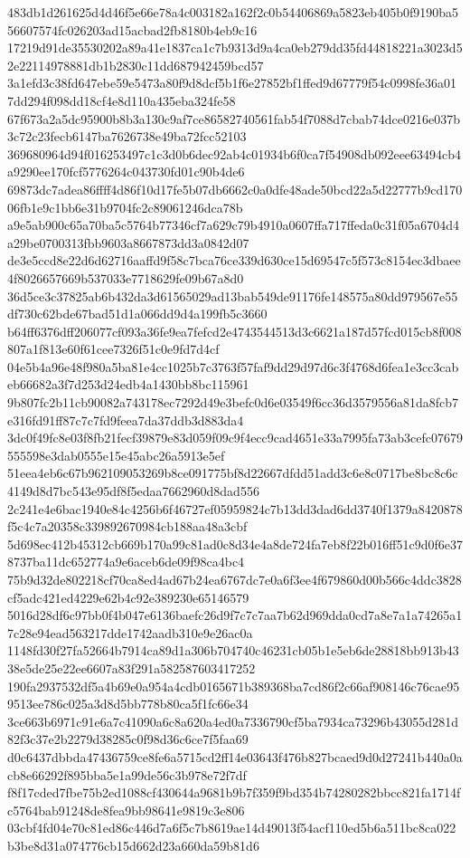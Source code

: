 \documentclass[11pt,a4paper]{article}
\begin{document}
{483db1d261625d4d46f5e66e78a4c003182a162f2c0b54406869a5823eb405b0f9190ba556607574fc026203ad15acbad2fb8180b4eb9c16
17219d91de35530202a89a41e1837ca1c7b9313d9a4ca0eb279dd35fd44818221a3023d52e22114978881db1b2830c11dd687942459bcd57
3a1efd3c38fd647ebe59e5473a80f9d8dcf5b1f6e27852bf1ffed9d67779f54c0998fe36a017dd294f098dd18cf4e8d110a435eba324fe58
67f673a2a5dc95900b8b3a130c9af7ce86582740561fab54f7088d7cbab74dce0216e037b3c72c23fecb6147ba7626738e49ba72fcc52103
369680964d94f016253497c1c3d0b6dec92ab4c01934b6f0ca7f54908db092eee63494cb4a9290ee170fcf5776264c043730fd01c90b4de6
69873dc7adea86ffff4d86f10d17fe5b07db6662c0a0dfe48ade50bcd22a5d22777b9cd17006fb1e9c1bb6e31b9704fc2c89061246dca78b
a9e5ab900c65a70ba5c5764b77346cf7a629c79b4910a0607ffa717ffeda0c31f05a6704d4a29be0700313fbb9603a8667873dd3a0842d07
de3e5ccd8e22d6d62716aaffd9f58c7bca76ce339d630ce15d69547c5f573c8154ec3dbaee4f8026657669b537033e7718629fe09b67a8d0
36d5ce3c37825ab6b432da3d61565029ad13bab549de91176fe148575a80dd979567e55df730c62bde67bad51d1a066dd9d4a199fb5c3660
b64ff6376dff206077cf093a36fe9ea7fefcd2e4743544513d3c6621a187d57fcd015cb8f008807a1f813e60f61cee7326f51c0e9fd7d4cf
04e5b4a96e48f980a5ba81e4cc1025b7c3763f57faf9dd29d97d6c3f4768d6fea1e3cc3cabeb66682a3f7d253d24edb4a1430bb8bc115961
9b807fc2b11cb90082a743178ec7292d49e3befc0d6e03549f6cc36d3579556a81da8fcb7e316fd91ff87c7c7fd9feea7da37ddb3d883da4
3dc0f49fc8e03f8fb21fecf39879e83d059f09c9f4ecc9cad4651e33a7995fa73ab3cefc07679555598e3dab0555e15e45abc26a5913e5ef
51eea4eb6c67b962109053269b8ce091775bf8d22667dfdd51add3c6e8c0717be8bc8c6c4149d8d7bc543e95df8f5edaa7662960d8dad556
2c241e4e6bac1940e84c4256b6f46727ef05959824c7b13dd3dad6dd3740f1379a8420878f5c4c7a20358c339892670984cb188aa48a3cbf
5d698ec412b45312cb669b170a99c81ad0c8d34e4a8de724fa7eb8f22b016ff51c9d0f6e378737ba11dc652774a9e6aceb6de09f98ca4bc4
75b9d32de802218cf70ca8ed4ad67b24ea6767dc7e0a6f3ee4f679860d00b566c4ddc3828cf5adc421ed4229e62b4c92e389230e65146579
5016d28df6c97bb0f4b047e6136baefc26d9f7c7c7aa7b62d969dda0cd7a8e7a1a74265a17c28e94ead563217dde1742aadb310e9e26ac0a
1148fd30f27fa52664b7914ca89d1a306b704740c46231cb05b1e5eb6de28818bb913b4338e5de25e22ee6607a83f291a582587603417252
190fa2937532df5a4b69e0a954a4cdb0165671b389368ba7cd86f2c66af908146c76cae959513ee786c025a3d8d5bb778b80ca5f1fc66e34
3ce663b6971c91e6a7c41090a6c8a620a4ed0a7336790cf5ba7934ca73296b43055d281d82f3c37e2b2279d38285c0f98d36c6ce7f5faa69
d0c6437dbbda47436759ce8fe6a5715cd2ff14e03643f476b827bcaed9d0d27241b440a0acb8e66292f895bba5e1a99de56c3b978e72f7df
f8f17cded7fbe75b2ed1088cf430644a9681b9b7f359f9bd354b74280282bbcc821fa1714fc5764bab91248de8fea9bb98641e9819c3e806
03cbf4fd04e70c81ed86c446d7a6f5c7b8619ae14d49013f54acf110ed5b6a511bc8ca022b3be8d31a074776cb15d662d23a660da59b81d6
}
\end{document}
